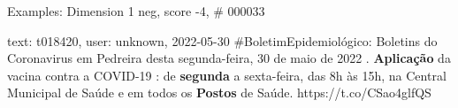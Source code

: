 \begin{frame}{Examples: Dimension 1 neg, score -4, \# 000033}
\footnotesize
\begin{alertblock}{text: t018420, user: unknown, 2022-05-30}
\#BoletimEpidemiológico: Boletins do Coronavirus em Pedreira desta 
segunda-feira, 30 de maio de 2022 .  \textbf{Aplicação} da 
vacina contra a COVID-19 : de \textbf{segunda} a sexta-feira, das 8h às 15h, na 
Central Municipal de Saúde e em todos os \textbf{Postos} de Saúde. 
https://t.co/CSao4glfQS 
\end{alertblock}
\end{frame}

